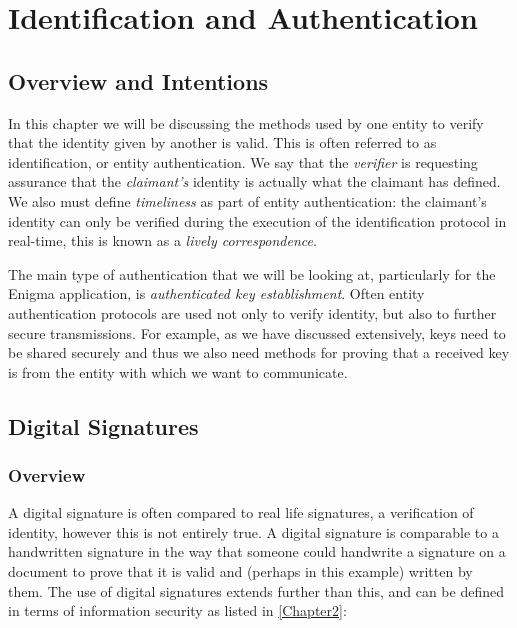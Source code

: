 
\chapter{Identification and Authentication} 
\label{Chapter5}

\section{Overview and Intentions}

In this chapter we will be discussing the methods used by one entity to verify that the identity given by another is valid. This is often referred to as identification, or entity authentication. We say that the \emph{verifier} is requesting assurance that the \emph{claimant's} identity is actually what the claimant has defined. We also must define \emph{timeliness} as part of entity authentication: the claimant's identity can only be verified during the execution of the identification protocol in real-time, this is known as a \emph{lively correspondence}.

The main type of authentication that we will be looking at, particularly for the Enigma application, is \emph{authenticated key establishment}. Often entity authentication protocols are used not only to verify identity, but also to further secure transmissions. For example, as we have discussed extensively, keys need to be shared securely and thus we also need methods for proving that a received key is from the entity with which we want to communicate. 

\section{Digital Signatures}

  \subsection{Overview}
  
  A digital signature is often compared to real life signatures, a verification of identity, however this is not entirely true. A digital signature is comparable to a handwritten signature in the way that someone could handwrite a signature on a document to prove that it is valid and (perhaps in this example) written by them. The use of digital signatures extends further than this, and can be defined in terms of information security as listed in \textsection\ref{Chapter2}:
  
